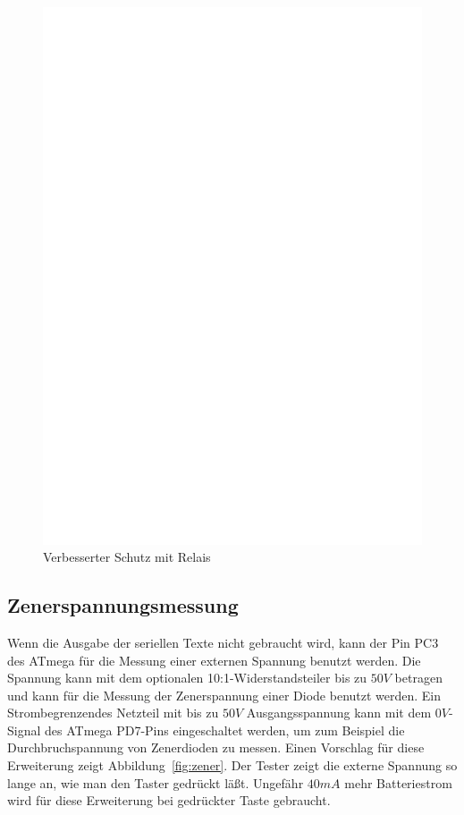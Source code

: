 \begin{figure}[H]
\centering
\includegraphics[width=18cm]{../FIG/relay_um_addon.eps}
\caption{Verbesserter Schutz mit Relais}
\label{fig:relay_um_addon}
\end{figure}

\subsection{Zenerspannungsmessung}

Wenn die Ausgabe der seriellen Texte nicht gebraucht wird, kann der Pin PC3 des ATmega für die Messung
einer externen Spannung benutzt werden. Die Spannung kann mit dem optionalen 10:1-Widerstandsteiler
bis zu \(50V\) betragen und kann für die Messung der Zenerspannung einer Diode benutzt werden.
Ein Strombegrenzendes Netzteil mit bis zu \(50V\) Ausgangsspannung kann mit dem \(0V\)-Signal des ATmega PD7-Pins
eingeschaltet werden, um zum Beispiel die Durchbruchspannung von Zenerdioden zu messen.
Einen Vorschlag für diese Erweiterung zeigt Abbildung~\ref{fig:zener}.
Der Tester zeigt die externe Spannung so lange an, wie man den Taster gedrückt läßt.
Ungefähr \(40mA\) mehr Batteriestrom wird für diese Erweiterung bei gedrückter Taste gebraucht.

